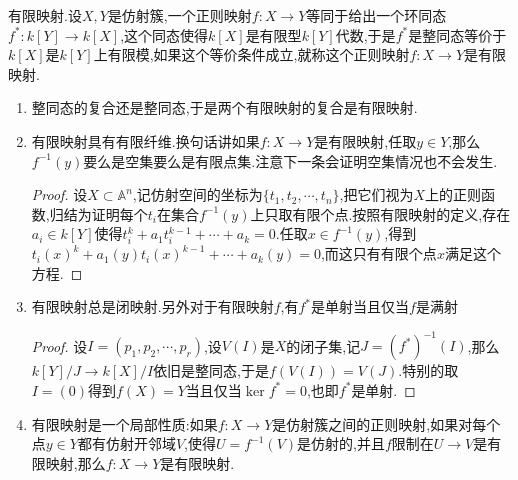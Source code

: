 有限映射.设$X,Y$是仿射簇,一个正则映射$f:X\to Y$等同于给出一个环同态$f^*:k[Y]\to k[X]$,这个同态使得$k[X]$是有限型$k[Y]$代数,于是$f^*$是整同态等价于$k[X]$是$k[Y]$上有限模,如果这个等价条件成立,就称这个正则映射$f:X\to Y$是有限映射.
\begin{enumerate}
	\item 整同态的复合还是整同态,于是两个有限映射的复合是有限映射.
	\item 有限映射具有有限纤维.换句话讲如果$f:X\to Y$是有限映射,任取$y\in Y$,那么$f^{-1}(y)$要么是空集要么是有限点集.注意下一条会证明空集情况也不会发生.
	\begin{proof}
		
		设$X\subset\mathbb{A}^n$,记仿射空间的坐标为$\{t_1,t_2,\cdots,t_n\}$,把它们视为$X$上的正则函数,归结为证明每个$t_i$在集合$f^{-1}(y)$上只取有限个点.按照有限映射的定义,存在$a_i\in k[Y]$使得$t_i^k+a_1t_i^{k-1}+\cdots+a_k=0$.任取$x\in f^{-1}(y)$,得到$t_i(x)^k+a_1(y)t_i(x)^{k-1}+\cdots+a_k(y)=0$,而这只有有限个点$x$满足这个方程.
	\end{proof}
    \item 有限映射总是闭映射.另外对于有限映射$f$,有$f^*$是单射当且仅当$f$是满射
    \begin{proof}
    	
    	设$I=(p_1,p_2,\cdots,p_r)$,设$V(I)$是$X$的闭子集,记$J=(f^*)^{-1}(I)$,那么$k[Y]/J\to k[X]/I$依旧是整同态,于是$f(V(I))=V(J)$.特别的取$I=(0)$得到$f(X)=Y$当且仅当$\ker f^*=0$,也即$f^*$是单射.
    \end{proof}
    \item 有限映射是一个局部性质:如果$f:X\to Y$是仿射簇之间的正则映射,如果对每个点$y\in Y$都有仿射开邻域$V$,使得$U=f^{-1}(V)$是仿射的,并且$f$限制在$U\to V$是有限映射,那么$f:X\to Y$是有限映射.
\end{enumerate}

